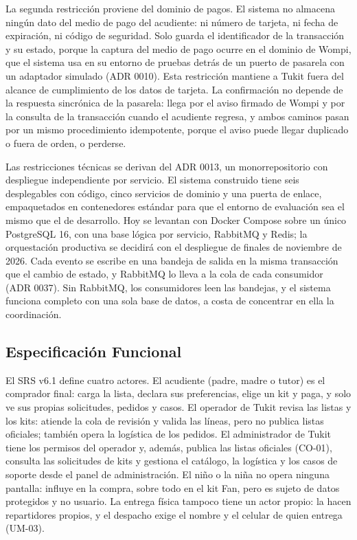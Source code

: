 La segunda restricción proviene del dominio de pagos. El sistema no almacena ningún dato del
medio de pago del acudiente: ni número de tarjeta, ni fecha de expiración, ni código de
seguridad. Solo guarda el identificador de la transacción y su estado, porque la captura del
medio de pago ocurre en el dominio de Wompi, que el sistema usa en su entorno de pruebas
detrás de un puerto de pasarela con un adaptador simulado (ADR 0010). Esta restricción
mantiene a Tukit fuera del alcance de cumplimiento de los datos de tarjeta. La confirmación
no depende de la respuesta sincrónica de la pasarela: llega por el aviso firmado de Wompi y
por la consulta de la transacción cuando el acudiente regresa, y ambos caminos pasan por un
mismo procedimiento idempotente, porque el aviso puede llegar duplicado o fuera de orden, o
perderse.

Las restricciones técnicas se derivan del ADR 0013, un monorrepositorio con despliegue
independiente por servicio. El sistema construido tiene seis desplegables con código, cinco
servicios de dominio y una puerta de enlace, empaquetados en contenedores estándar para que
el entorno de evaluación sea el mismo que el de desarrollo. Hoy se levantan con Docker
Compose sobre un único PostgreSQL 16, con una base lógica por servicio, RabbitMQ y Redis; la
orquestación productiva se decidirá con el despliegue de finales de noviembre de 2026. Cada
evento se escribe en una bandeja de salida en la misma transacción que el cambio de estado, y
RabbitMQ lo lleva a la cola de cada consumidor (ADR 0037). Sin RabbitMQ, los consumidores leen
las bandejas, y el sistema funciona completo con una sola base de datos, a costa de concentrar
en ella la coordinación.

\subsection{Especificación Funcional}
\label{sec:especificacion-funcional}

El SRS v6.1 define cuatro actores. El acudiente (padre, madre o tutor) es el comprador final:
carga la lista, declara sus preferencias, elige un kit y paga, y solo ve sus propias
solicitudes, pedidos y casos. El operador de Tukit revisa las listas y los kits: atiende la
cola de revisión y valida las líneas, pero no publica listas oficiales; también opera la
logística de los pedidos. El administrador de
Tukit tiene los permisos del operador y, además, publica las listas oficiales (CO-01), consulta
las solicitudes de kits y gestiona el catálogo, la logística y los casos de soporte desde el
panel de administración. El niño o la niña no opera ninguna pantalla: influye en la compra,
sobre todo en el kit Fan, pero es sujeto de datos protegidos y no usuario. La entrega física
tampoco tiene un actor propio: la hacen repartidores propios, y el despacho exige el nombre y
el celular de quien entrega (UM-03).

